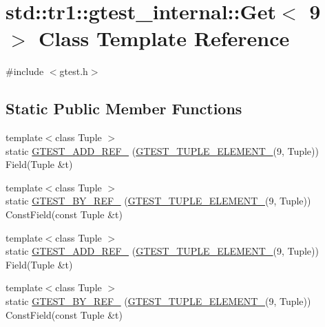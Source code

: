\hypertarget{classstd_1_1tr1_1_1gtest__internal_1_1_get_3_019_01_4}{\section{std\-:\-:tr1\-:\-:gtest\-\_\-internal\-:\-:Get$<$ 9 $>$ Class Template Reference}
\label{classstd_1_1tr1_1_1gtest__internal_1_1_get_3_019_01_4}
}


{\ttfamily \#include $<$gtest.\-h$>$}

\subsection*{Static Public Member Functions}
\begin{DoxyCompactItemize}
\item 
{\footnotesize template$<$class Tuple $>$ }\\static \hyperlink{classstd_1_1tr1_1_1gtest__internal_1_1_get_3_019_01_4_add31197dfdb381d265e221ed62129f45}{G\-T\-E\-S\-T\-\_\-\-A\-D\-D\-\_\-\-R\-E\-F\-\_\-} (\hyperlink{gtest-tuple_8h_a1b7f133d8aa02e0b7afed7b66781eeb7}{G\-T\-E\-S\-T\-\_\-\-T\-U\-P\-L\-E\-\_\-\-E\-L\-E\-M\-E\-N\-T\-\_\-}(9, Tuple)) Field(Tuple \&t)
\item 
{\footnotesize template$<$class Tuple $>$ }\\static \hyperlink{classstd_1_1tr1_1_1gtest__internal_1_1_get_3_019_01_4_a5205e8da729e2bee446f5be0c65390af}{G\-T\-E\-S\-T\-\_\-\-B\-Y\-\_\-\-R\-E\-F\-\_\-} (\hyperlink{gtest-tuple_8h_a1b7f133d8aa02e0b7afed7b66781eeb7}{G\-T\-E\-S\-T\-\_\-\-T\-U\-P\-L\-E\-\_\-\-E\-L\-E\-M\-E\-N\-T\-\_\-}(9, Tuple)) Const\-Field(const Tuple \&t)
\item 
{\footnotesize template$<$class Tuple $>$ }\\static \hyperlink{classstd_1_1tr1_1_1gtest__internal_1_1_get_3_019_01_4_add31197dfdb381d265e221ed62129f45}{G\-T\-E\-S\-T\-\_\-\-A\-D\-D\-\_\-\-R\-E\-F\-\_\-} (\hyperlink{gtest-tuple_8h_a1b7f133d8aa02e0b7afed7b66781eeb7}{G\-T\-E\-S\-T\-\_\-\-T\-U\-P\-L\-E\-\_\-\-E\-L\-E\-M\-E\-N\-T\-\_\-}(9, Tuple)) Field(Tuple \&t)
\item 
{\footnotesize template$<$class Tuple $>$ }\\static \hyperlink{classstd_1_1tr1_1_1gtest__internal_1_1_get_3_019_01_4_a5205e8da729e2bee446f5be0c65390af}{G\-T\-E\-S\-T\-\_\-\-B\-Y\-\_\-\-R\-E\-F\-\_\-} (\hyperlink{gtest-tuple_8h_a1b7f133d8aa02e0b7afed7b66781eeb7}{G\-T\-E\-S\-T\-\_\-\-T\-U\-P\-L\-E\-\_\-\-E\-L\-E\-M\-E\-N\-T\-\_\-}(9, Tuple)) Const\-Field(const Tuple \&t)
\end{DoxyCompactItemize}


